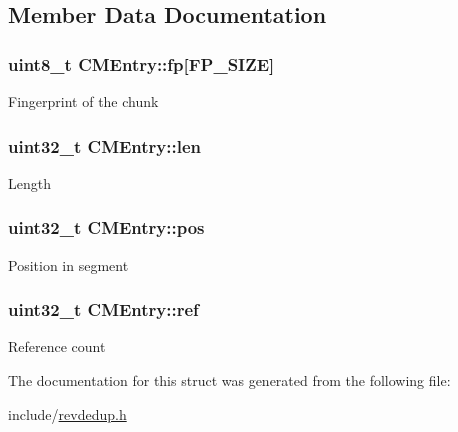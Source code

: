 \subsection{\-Member \-Data \-Documentation}
\hypertarget{structCMEntry_a4edfc6334502a1563f4b0e0737bf7134}{
\subsubsection[{fp}]{\setlength{\rightskip}{0pt plus 5cm}uint8\-\_\-t {\bf \-C\-M\-Entry\-::fp}\mbox{[}{\bf \-F\-P\-\_\-\-S\-I\-Z\-E}\mbox{]}}}\label{structCMEntry_a4edfc6334502a1563f4b0e0737bf7134}
\-Fingerprint of the chunk \hypertarget{structCMEntry_aaf3dd315b41ef4381c27ec6ce7a65f8f}{
\subsubsection[{len}]{\setlength{\rightskip}{0pt plus 5cm}uint32\-\_\-t {\bf \-C\-M\-Entry\-::len}}}\label{structCMEntry_aaf3dd315b41ef4381c27ec6ce7a65f8f}
\-Length \hypertarget{structCMEntry_a4fd391c9e176a8a0b6ff58134d39917d}{
\subsubsection[{pos}]{\setlength{\rightskip}{0pt plus 5cm}uint32\-\_\-t {\bf \-C\-M\-Entry\-::pos}}}\label{structCMEntry_a4fd391c9e176a8a0b6ff58134d39917d}
\-Position in segment \hypertarget{structCMEntry_ac57dde891eb1232477653a7775aa0b55}{
\subsubsection[{ref}]{\setlength{\rightskip}{0pt plus 5cm}uint32\-\_\-t {\bf \-C\-M\-Entry\-::ref}}}\label{structCMEntry_ac57dde891eb1232477653a7775aa0b55}
\-Reference count 

\-The documentation for this struct was generated from the following file\-:\begin{DoxyCompactItemize}
\item 
include/\hyperlink{revdedup_8h}{revdedup.\-h}\end{DoxyCompactItemize}
